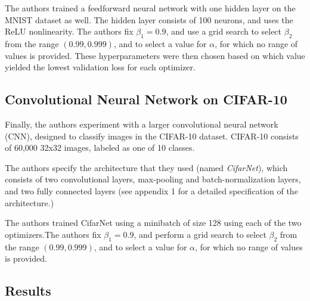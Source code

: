 \documentclass[letterpaper, 10 pt, conference]{ieeeconf}  %
\begin{document}
The authors trained a feedforward neural network with one hidden layer on the MNIST dataset as well. The hidden layer consists of 100 neurons, and uses the ReLU nonlinearity. The authors fix $\beta_{1} = 0.9$, and use a grid search to select $\beta_{2}$ from the range $(0.99, 0.999)$, and to select a value for $\alpha$, for which no range of values is provided. These hyperparameters were then chosen based on which value yielded the lowest validation loss for each optimizer. 

\subsection{Convolutional Neural Network on CIFAR-10}

Finally, the authors experiment with a larger convolutional neural network (CNN), designed to classify images in the CIFAR-10 dataset. CIFAR-10 consists of 60,000  32x32 images, labeled as one of 10 classes.

The authors specify the architecture that they used (named \emph{CifarNet}), which consists of two convolutional layers, max-pooling and batch-normalization layers, and two fully connected layers (see appendix 1 for a detailed specification of the architecture.)

The authors trained CifarNet using a minibatch of size 128 using each of the two optimizers.The authors fix $\beta_{1} = 0.9$, and perform a grid search to select $\beta_{2}$ from the range $(0.99, 0.999)$, and to select a value for $\alpha$, for which no range of values is provided.

\subsection{Results}
\end{document}
